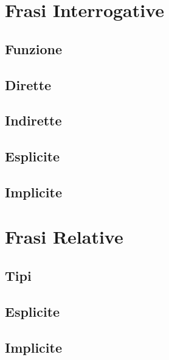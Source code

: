 \documentclass[a4paper,twoside,11pt,chapterprefix=false,bibliography=totocnumbered,listof=flat]{scrbook}
\begin{document}
\hypertarget{frasi-interrogative}{%
\chapter{Frasi Interrogative}\label{frasi-interrogative}}

\hypertarget{funzione-2}{%
\section{Funzione}\label{funzione-2}}

\hypertarget{dirette}{%
\section{Dirette}\label{dirette}}

\hypertarget{indirette}{%
\section{Indirette}\label{indirette}}

\hypertarget{esplicite}{%
\section{Esplicite}\label{esplicite}}

\hypertarget{implicite}{%
\section{Implicite}\label{implicite}}

\hypertarget{frasi-relative}{%
\chapter{Frasi Relative}\label{frasi-relative}}

\hypertarget{tipi}{%
\section{Tipi}\label{tipi}}

\hypertarget{esplicite-1}{%
\section{Esplicite}\label{esplicite-1}}

\hypertarget{implicite-1}{%
\section{Implicite}\label{implicite-1}}
\end{document}

